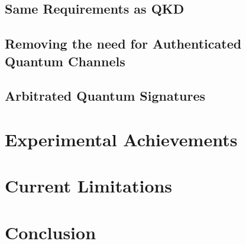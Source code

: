 \documentclass[%
 reprint,
 amsmath,amssymb,
 aps,
 pra,
]{revtex4-1}
\begin{document}
\subsection{Same Requirements as QKD}

\subsection{Removing the need for Authenticated Quantum Channels}

\subsection{Arbitrated Quantum Signatures}

\section{Experimental Achievements}

\section{Current Limitations}

\section{Conclusion}

\end{document}
